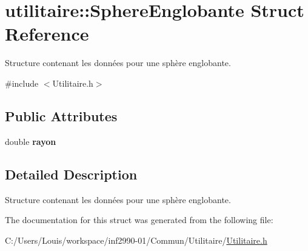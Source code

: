 \hypertarget{structutilitaire_1_1_sphere_englobante}{}\section{utilitaire\+:\+:Sphere\+Englobante Struct Reference}
\label{structutilitaire_1_1_sphere_englobante}


Structure contenant les données pour une sphère englobante.  




{\ttfamily \#include $<$Utilitaire.\+h$>$}

\subsection*{Public Attributes}
\begin{DoxyCompactItemize}
\item 
\hypertarget{structutilitaire_1_1_sphere_englobante_aa340be7e333276aaa7bb2dc18ad33100}{}double {\bfseries rayon}\label{structutilitaire_1_1_sphere_englobante_aa340be7e333276aaa7bb2dc18ad33100}

\end{DoxyCompactItemize}


\subsection{Detailed Description}
Structure contenant les données pour une sphère englobante. 

The documentation for this struct was generated from the following file\+:\begin{DoxyCompactItemize}
\item 
C\+:/\+Users/\+Louis/workspace/inf2990-\/01/\+Commun/\+Utilitaire/\hyperlink{_utilitaire_8h}{Utilitaire.\+h}\end{DoxyCompactItemize}
